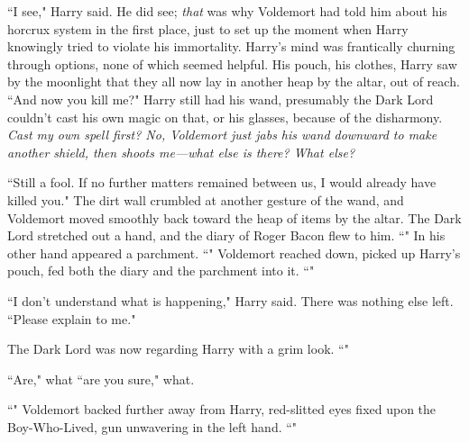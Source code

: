 ``I see," Harry said. He did see; \emph{that} was why Voldemort had told him about his horcrux system in the first place, just to set up the moment when Harry knowingly tried to violate his immortality. Harry's mind was frantically churning through options, none of which seemed helpful. His pouch, his clothes, Harry saw by the moonlight that they all now lay in another heap by the altar, out of reach. ``And now you kill me?" Harry still had his wand, presumably the Dark Lord couldn't cast his own magic on that, or his glasses, because of the disharmony. \emph{Cast my own spell first? No, Voldemort just jabs his wand downward to make another shield, then shoots me—what else is there? \emph{What else?}}

``Still a fool. If no further matters remained between us, I would already have killed you." The dirt wall crumbled at another gesture of the wand, and Voldemort moved smoothly back toward the heap of items by the altar. The Dark Lord stretched out a hand, and the diary of Roger Bacon flew to him. ``" In his other hand appeared a parchment. ``" Voldemort reached down, picked up Harry's pouch, fed both the diary and the parchment into it. ``"

``I don't understand what is happening," Harry said. There was nothing else left. ``Please explain to me."

The Dark Lord was now regarding Harry with a grim look. ``"

``Are," what ``are you sure," what.

``" Voldemort backed further away from Harry, red-slitted eyes fixed upon the Boy-Who-Lived, gun unwavering in the left hand. ``"

